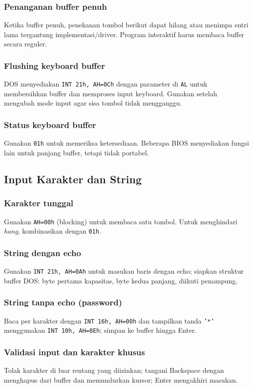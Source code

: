 \subsubsection{Penanganan buffer penuh}
Ketika buffer penuh, penekanan tombol berikut dapat hilang atau menimpa entri lama tergantung implementasi/driver. Program interaktif harus membaca buffer secara reguler.

\subsubsection{Flushing keyboard buffer}
DOS menyediakan \texttt{INT 21h, AH=0Ch} dengan parameter di \texttt{AL} untuk membersihkan buffer dan memproses input keyboard. Gunakan setelah mengubah mode input agar sisa tombol tidak mengganggu.

\subsubsection{Status keyboard buffer}
Gunakan \texttt{01h} untuk memeriksa ketersediaan. Beberapa BIOS menyediakan fungsi lain untuk panjang buffer, tetapi tidak portabel.

\subsection{Input Karakter dan String}
\subsubsection{Karakter tunggal}
Gunakan \texttt{AH=00h} (blocking) untuk membaca satu tombol. Untuk menghindari \textit{hang}, kombinasikan dengan \texttt{01h}.

\subsubsection{String dengan echo}
Gunakan \texttt{INT 21h, AH=0Ah} untuk masukan baris dengan echo; siapkan struktur buffer DOS: byte pertama kapasitas, byte kedua panjang, diikuti penampung.

\subsubsection{String tanpa echo (password)}
Baca per karakter dengan \texttt{INT 16h, AH=00h} dan tampilkan tanda \texttt{'*'} menggunakan \texttt{INT 10h, AH=0Eh}; simpan ke buffer hingga Enter.

\subsubsection{Validasi input dan karakter khusus}
Tolak karakter di luar rentang yang diizinkan; tangani Backspace dengan menghapus dari buffer dan memundurkan kursor; Enter mengakhiri masukan.

